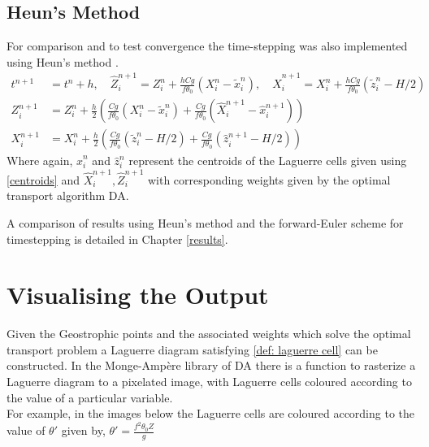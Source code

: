 \subsection{Heun's Method}
For comparison and to test convergence the time-stepping was also implemented using Heun's method \cite{Griffiths2010}.
\begin{equation}
	\begin{aligned}
	t^{n+1} &= t^{n} + h, \quad
	\hat{Z}_i^{n+1} = Z_i^n +  \frac{hCg}{f\theta_0}\left(X_i^n-\tilde{x}_i^n\right), \quad
	\hat{X}_i^{n+1}  = X_i^n +  \frac{hCg}{f\theta_0}\left(\tilde{z}_i^n-H/2\right)\\
	Z_i^{n+1} &= Z_i^n + \frac{h}{2}\left( \frac{Cg}{f\theta_0}\left(X_i^n-\tilde{x}_i^n\right)+ \frac{Cg}{f\theta_0}\left(\hat{X}_i^{n+1}-\hat{x}_i^{n+1}\right)\right)\\
	X_i^{n+1}  &= X_i^n + \frac{h}{2}\left( \frac{Cg}{f\theta_0}\left(\tilde{z}_i^n-H/2\right) + \frac{Cg}{f\theta_0}\left(\hat{z}_i^{n+1}-H/2\right)\right)
	\end{aligned}
\end{equation}
Where again, $\hat{x}_i^n$ and $\hat{z}_i^n$ represent the centroids of the Laguerre cells given using \ref{centroids} and $\hat{X}_i^{n+1},\hat{Z}_i^{n+1}$ with corresponding weights given by the optimal transport algorithm DA.

A comparison of results using Heun's method and the forward-Euler scheme for timestepping is detailed in Chapter \ref{results}.
\section{Visualising the Output \label{plotting}}
Given the Geostrophic points and the associated weights which solve the optimal transport problem a Laguerre diagram satisfying \ref{def: laguerre cell} can be constructed. In the Monge-Amp\`{e}re library of DA \cite{Merigot2017,Merigot2017a} there is a function to rasterize a Laguerre diagram to a pixelated image, with Laguerre cells coloured according to the value of a particular variable.\\
\linebreak
For example, in the images below the Laguerre cells are coloured according to the value of $\theta '$ given by, $\theta ' = \frac{f^2\theta_0 Z}{g}$
